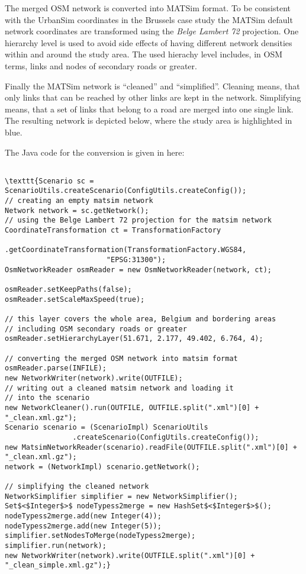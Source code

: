 The merged OSM network is converted into MATSim format. To be  consistent with the UrbanSim coordinates in the Brussels case study the  MATSim default network coordinates are transformed using the \emph{Belge Lambert 72}  projection. One hierarchy level is used to avoid side effects of having  different network densities within and around the study area. The used  hierachy level includes, in OSM terms, links and nodes of secondary  roads or greater.

Finally the MATSim network is “cleaned” and “simplified”. Cleaning  means, that only links that can be reached by other links are kept in  the network. Simplifying means, that a set of links that belong to a  road are merged into one single link. The resulting network is depicted  below, where the study area is highlighted in blue.

The Java code for the conversion is given in here:
\begin{verbatim}

\texttt{Scenario sc = ScenarioUtils.createScenario(ConfigUtils.createConfig());
// creating an empty matsim network
Network network = sc.getNetwork();
// using the Belge Lambert 72 projection for the matsim network
CoordinateTransformation ct = TransformationFactory
                .getCoordinateTransformation(TransformationFactory.WGS84,
                        "EPSG:31300");
OsmNetworkReader osmReader = new OsmNetworkReader(network, ct);

osmReader.setKeepPaths(false);
osmReader.setScaleMaxSpeed(true);

// this layer covers the whole area, Belgium and bordering areas
// including OSM secondary roads or greater
osmReader.setHierarchyLayer(51.671, 2.177, 49.402, 6.764, 4);

// converting the merged OSM network into matsim format
osmReader.parse(INFILE);
new NetworkWriter(network).write(OUTFILE);
// writing out a cleaned matsim network and loading it
// into the scenario
new NetworkCleaner().run(OUTFILE, OUTFILE.split(".xml")[0] + "_clean.xml.gz");
Scenario scenario = (ScenarioImpl) ScenarioUtils
                .createScenario(ConfigUtils.createConfig());
new MatsimNetworkReader(scenario).readFile(OUTFILE.split(".xml")[0] + "_clean.xml.gz");
network = (NetworkImpl) scenario.getNetwork();

// simplifying the cleaned network
NetworkSimplifier simplifier = new NetworkSimplifier();
Set$<$Integer$>$ nodeTypess2merge = new HashSet$<$Integer$>$();
nodeTypess2merge.add(new Integer(4));
nodeTypess2merge.add(new Integer(5));
simplifier.setNodesToMerge(nodeTypess2merge);
simplifier.run(network);
new NetworkWriter(network).write(OUTFILE.split(".xml")[0] + "_clean_simple.xml.gz");}
\end{verbatim}




